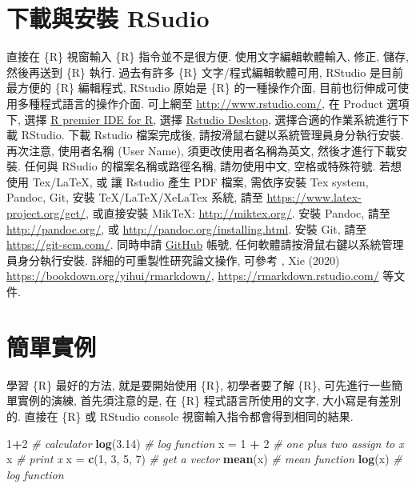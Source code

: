 \documentclass[
]{book}
\newenvironment{Shaded}{\begin{snugshade}}{\end{snugshade}}
\newcommand{\CommentTok}[1]{\textcolor[rgb]{0.56,0.35,0.01}{\textit{#1}}}
\newcommand{\DecValTok}[1]{\textcolor[rgb]{0.00,0.00,0.81}{#1}}
\newcommand{\FloatTok}[1]{\textcolor[rgb]{0.00,0.00,0.81}{#1}}
\newcommand{\KeywordTok}[1]{\textcolor[rgb]{0.13,0.29,0.53}{\textbf{#1}}}
\newcommand{\NormalTok}[1]{#1}
\newcommand{\OperatorTok}[1]{\textcolor[rgb]{0.81,0.36,0.00}{\textbf{#1}}}
\newcommand{\StringTok}[1]{\textcolor[rgb]{0.31,0.60,0.02}{#1}}
\begin{document}
\hypertarget{ux4e0bux8f09ux8207ux5b89ux88dd-rsudio}{%
\section{下載與安裝 RSudio}\label{ux4e0bux8f09ux8207ux5b89ux88dd-rsudio}}

直接在 \{R\} 視窗輸入 \{R\} 指令並不是很方便.
使用文字編輯軟體輸入, 修正, 儲存, 然後再送到 \{R\} 執行.
過去有許多 \{R\} 文字/程式編輯軟體可用,
RStudio 是目前最方便的 \{R\} 編輯程式,
RStudio 原始是 \{R\} 的一種操作介面,
目前也衍伸成可使用多種程式語言的操作介面.
可上網至 \url{http://www.rstudio.com/},
在 Product 選項下, 選擇 \href{https://rstudio.com/products/rstudio/}{R premier IDE for R},
選擇 \href{https://rstudio.com/products/rstudio/download/}{Rstudio Desktop},
選擇合適的作業系統進行下載 RStudio.
下載 Rstudio 檔案完成後,
請按滑鼠右鍵以系統管理員身分執行安裝.
再次注意,
使用者名稱 (User Name),
須更改使用者名稱為英文,
然後才進行下載安裝.
任何與 RSudio 的檔案名稱或路徑名稱,
請勿使用中文, 空格或特殊符號.
若想使用 Tex/LaTeX, 或 讓 Rstudio 產生 PDF 檔案,
需依序安裝 Tex system, Pandoc, Git,
安裝 TeX/LaTeX/XeLaTex 系統,
請至 \url{https://www.latex-project.org/get/},
或直接安裝 MikTeX: \url{http://miktex.org/}.
安裝 Pandoc,
請至 \url{http://pandoc.org/},
或 \url{http://pandoc.org/installing.html}.
安裝 Git, 請至 \url{https://git-scm.com/}.
同時申請 \href{https://github.com/}{GitHub} 帳號,
任何軟體請按滑鼠右鍵以系統管理員身分執行安裝.
詳細的可重製性研究論文操作,
可參考 \citep{xie2015}, Xie (2020) \url{https://bookdown.org/yihui/rmarkdown/},
\url{https://rmarkdown.rstudio.com/} 等文件.

\hypertarget{ux7c21ux55aeux5be6ux4f8b}{%
\section{簡單實例}\label{ux7c21ux55aeux5be6ux4f8b}}

學習 \{R\} 最好的方法, 就是要開始使用 \{R\}, 初學者要了解 \{R\}, 可先進行一些簡單實例的演練,
首先須注意的是, 在 \{R\} 程式語言所使用的文字, 大小寫是有差別的.
直接在 \{R\} 或 RStudio console 視窗輸入指令都會得到相同的結果.

\begin{Shaded}
\begin{Highlighting}[]
\DecValTok{1}\OperatorTok{+}\DecValTok{2}         \CommentTok{\# calculator}
\KeywordTok{log}\NormalTok{(}\FloatTok{3.14}\NormalTok{)   }\CommentTok{\# log function}
\NormalTok{x =}\StringTok{ }\DecValTok{1} \OperatorTok{+}\StringTok{ }\DecValTok{2}   \CommentTok{\# one plus two assign to x}
\NormalTok{x           }\CommentTok{\# print x}
\NormalTok{x =}\StringTok{ }\KeywordTok{c}\NormalTok{(}\DecValTok{1}\NormalTok{, }\DecValTok{3}\NormalTok{, }\DecValTok{5}\NormalTok{, }\DecValTok{7}\NormalTok{) }\CommentTok{\# get a vector}
\KeywordTok{mean}\NormalTok{(x)     }\CommentTok{\# mean function}
\KeywordTok{log}\NormalTok{(x)      }\CommentTok{\# log function}
\end{Highlighting}
\end{Shaded}
\end{document}
